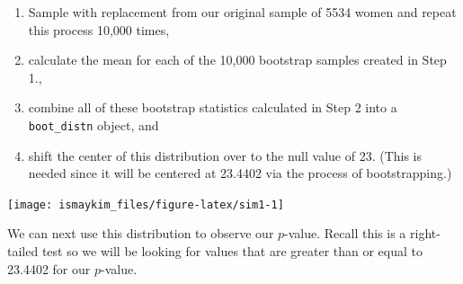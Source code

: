 \documentclass[]{tufte-book}
\newenvironment{Shaded}{\begin{snugshade}}{\end{snugshade}}
\newcommand{\KeywordTok}[1]{\textcolor[rgb]{0.13,0.29,0.53}{\textbf{{#1}}}}
\newcommand{\DataTypeTok}[1]{\textcolor[rgb]{0.13,0.29,0.53}{{#1}}}
\newcommand{\DecValTok}[1]{\textcolor[rgb]{0.00,0.00,0.81}{{#1}}}
\newcommand{\StringTok}[1]{\textcolor[rgb]{0.31,0.60,0.02}{{#1}}}
\newcommand{\OtherTok}[1]{\textcolor[rgb]{0.56,0.35,0.01}{{#1}}}
\newcommand{\NormalTok}[1]{{#1}}
\providecommand{\tightlist}{%
  \setlength{\itemsep}{0pt}\setlength{\parskip}{0pt}}
\theoremstyle{definition}
\theoremstyle{definition}
\theoremstyle{remark}
\begin{document}
\begin{enumerate}
\def\labelenumi{\arabic{enumi}.}
\tightlist
\item
  Sample with replacement from our original sample of 5534 women and
  repeat this process 10,000 times,
\item
  calculate the mean for each of the 10,000 bootstrap samples created in
  Step 1.,
\item
  combine all of these bootstrap statistics calculated in Step 2 into a
  \texttt{boot\_distn} object, and
\item
  shift the center of this distribution over to the null value of 23.
  (This is needed since it will be centered at 23.4402 via the process
  of bootstrapping.)
\end{enumerate}

\begin{Shaded}
\end{Shaded}

\begin{center}\texttt{[image: ismaykim\_files/figure-latex/sim1-1]} \end{center}

We can next use this distribution to observe our \(p\)-value. Recall
this is a right-tailed test so we will be looking for values that are
greater than or equal to 23.4402 for our \(p\)-value.

\begin{Shaded}
\end{Shaded}
\end{document}
